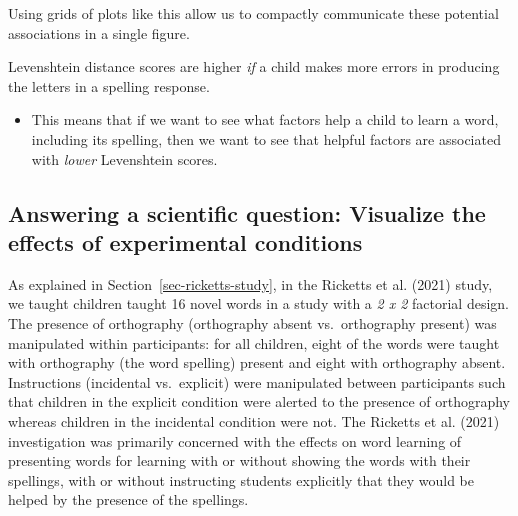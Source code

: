 \documentclass[
  letterpaper,
  DIV=11,
  numbers=noendperiod]{scrreprt}
\providecommand{\tightlist}{%
  \setlength{\itemsep}{0pt}\setlength{\parskip}{0pt}}\usepackage{longtable,booktabs,array}
\begin{document}
Using grids of plots like this allow us to compactly communicate these
potential associations in a single figure.

\begin{tcolorbox}[enhanced jigsaw, opacitybacktitle=0.6, title=\textcolor{quarto-callout-warning-color}{\faExclamationTriangle}\hspace{0.5em}{Warning}, arc=.35mm, colbacktitle=quarto-callout-warning-color!10!white, colframe=quarto-callout-warning-color-frame, leftrule=.75mm, opacityback=0, breakable, titlerule=0mm, left=2mm, bottomrule=.15mm, toprule=.15mm, colback=white, coltitle=black, bottomtitle=1mm, toptitle=1mm, rightrule=.15mm]

Levenshtein distance scores are higher \emph{if} a child makes more
errors in producing the letters in a spelling response.

\begin{itemize}
\tightlist
\item
  This means that if we want to see what factors help a child to learn a
  word, including its spelling, then we want to see that helpful factors
  are associated with \emph{lower} Levenshtein scores.
\end{itemize}

\end{tcolorbox}

\hypertarget{sec-visualize-effects}{%
\subsection{Answering a scientific question: Visualize the effects of
experimental conditions}\label{sec-visualize-effects}}

As explained in Section~\ref{sec-ricketts-study}, in the Ricketts et al.
(2021) study, we taught children taught 16 novel words in a study with a
\emph{2 x 2} factorial design. The presence of orthography (orthography
absent vs.~orthography present) was manipulated within participants: for
all children, eight of the words were taught with orthography (the word
spelling) present and eight with orthography absent. Instructions
(incidental vs.~explicit) were manipulated between participants such
that children in the explicit condition were alerted to the presence of
orthography whereas children in the incidental condition were not. The
Ricketts et al. (2021) investigation was primarily concerned with the
effects on word learning of presenting words for learning with or
without showing the words with their spellings, with or without
instructing students explicitly that they would be helped by the
presence of the spellings.
\end{document}
